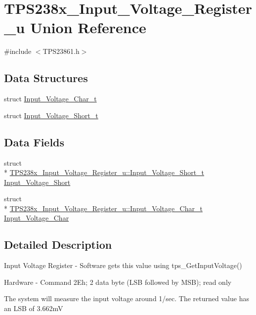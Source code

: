 \hypertarget{union_t_p_s238x___input___voltage___register__u}{\section{T\-P\-S238x\-\_\-\-Input\-\_\-\-Voltage\-\_\-\-Register\-\_\-u Union Reference}
\label{union_t_p_s238x___input___voltage___register__u}
}


{\ttfamily \#include $<$T\-P\-S23861.\-h$>$}

\subsection*{Data Structures}
\begin{DoxyCompactItemize}
\item 
struct \hyperlink{struct_t_p_s238x___input___voltage___register__u_1_1_input___voltage___char__t}{Input\-\_\-\-Voltage\-\_\-\-Char\-\_\-t}
\item 
struct \hyperlink{struct_t_p_s238x___input___voltage___register__u_1_1_input___voltage___short__t}{Input\-\_\-\-Voltage\-\_\-\-Short\-\_\-t}
\end{DoxyCompactItemize}
\subsection*{Data Fields}
\begin{DoxyCompactItemize}
\item 
struct \\*
\hyperlink{struct_t_p_s238x___input___voltage___register__u_1_1_input___voltage___short__t}{T\-P\-S238x\-\_\-\-Input\-\_\-\-Voltage\-\_\-\-Register\-\_\-u\-::\-Input\-\_\-\-Voltage\-\_\-\-Short\-\_\-t} \hyperlink{union_t_p_s238x___input___voltage___register__u_a896664df5da66b917948d3eb9fd97243}{Input\-\_\-\-Voltage\-\_\-\-Short}
\item 
struct \\*
\hyperlink{struct_t_p_s238x___input___voltage___register__u_1_1_input___voltage___char__t}{T\-P\-S238x\-\_\-\-Input\-\_\-\-Voltage\-\_\-\-Register\-\_\-u\-::\-Input\-\_\-\-Voltage\-\_\-\-Char\-\_\-t} \hyperlink{union_t_p_s238x___input___voltage___register__u_a5d2d668d4d56c5fa74cb4ccfe6cd11ea}{Input\-\_\-\-Voltage\-\_\-\-Char}
\end{DoxyCompactItemize}


\subsection{Detailed Description}
Input Voltage Register -\/ Software gets this value using tps\-\_\-\-Get\-Input\-Voltage() \par
 Hardware -\/ Command 2\-Eh; 2 data byte (L\-S\-B followed by M\-S\-B); read only \par
\par
 The system will measure the input voltage around 1/sec. The returned value has an L\-S\-B of 3.\-662m\-V 

